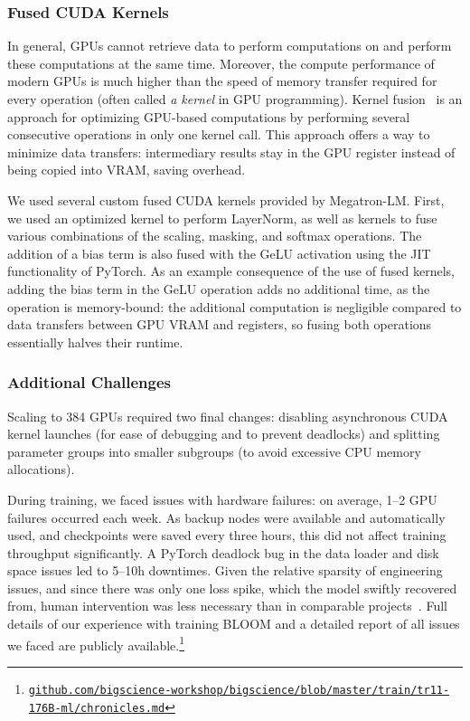 \subsubsection{Fused CUDA Kernels}

In general, GPUs cannot retrieve data to perform computations on and perform these computations at the same time. Moreover, the compute performance of modern GPUs is much higher than the speed of memory transfer required for every operation (often called \textit{a kernel} in GPU programming). Kernel fusion~\citep{kernel_fusion} is an approach for optimizing GPU-based computations by performing several consecutive operations in only one kernel call. This approach offers a way to minimize data transfers: intermediary results stay in the GPU register instead of being copied into VRAM, saving overhead. 

We used several custom fused CUDA kernels provided by Megatron-LM. First, we used an optimized kernel to perform LayerNorm, as well as kernels to fuse various combinations of the scaling, masking, and softmax operations. The addition of a bias term is also fused with the GeLU activation using the JIT functionality of PyTorch. As an example consequence of the use of fused kernels, adding the bias term in the GeLU operation adds no additional time, as the operation is memory-bound: the additional computation is negligible compared to data transfers between GPU VRAM and registers, so fusing both operations essentially halves their runtime.

\subsubsection{Additional Challenges}

Scaling to 384 GPUs required two final changes: disabling asynchronous CUDA kernel launches (for ease of debugging and to prevent deadlocks) and splitting parameter groups into smaller subgroups (to avoid excessive CPU memory allocations). 

During training, we faced issues with hardware failures: on average, 1--2 GPU failures occurred each week. As backup nodes were available and automatically used, and checkpoints were saved every three hours, this did not affect training throughput significantly. A PyTorch deadlock bug in the data loader and disk space issues led to 5--10h downtimes. Given the relative sparsity of engineering issues, and since there was only one loss spike, which the model swiftly recovered from, human intervention was less necessary than in comparable projects~\citep{zhang2022opt}. Full details of our experience with training BLOOM and a detailed report of all issues we faced are publicly available.\footnote{\href{https://github.com/bigscience-workshop/bigscience/blob/master/train/tr11-176B-ml/chronicles.md}{\texttt{github.com/bigscience-workshop/bigscience/blob/master/train/tr11-176B-ml/chronicles.md}}}

